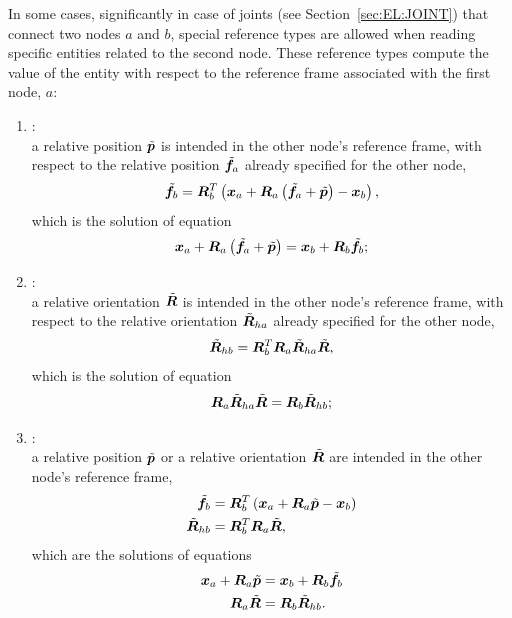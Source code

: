 In some cases, significantly in case of joints (see Section~\ref{sec:EL:JOINT}) that connect two nodes
$a$ and $b$, special reference types are allowed
when reading specific entities related to the second node.
These reference types compute the value of the entity with respect
to the reference frame associated with the first node, $a$:
\begin{enumerate}
\item {}: \\
	a relative position $\tilde{\boldsymbol{p}}$ is intended in the other node's
	reference frame, with respect to the relative position $\tilde{\boldsymbol{f}}_a$
	already specified for the other node,
\begin{equation}
	\tilde{\boldsymbol{f}}_b = \boldsymbol{R}_b^T\left( 
		\boldsymbol{x}_a + \boldsymbol{R}_a \left( 
			\tilde{\boldsymbol{f}}_a
			+ \tilde{\boldsymbol{p}}
		 \right)
		- \boldsymbol{x}_b
	 \right) ,
\end{equation}
	which is the solution of equation
\begin{equation}
	\boldsymbol{x}_a + \boldsymbol{R}_a \left( \tilde{\boldsymbol{f}}_a + \tilde{\boldsymbol{p}} \right)
	= \boldsymbol{x}_b + \boldsymbol{R}_b \tilde{\boldsymbol{f}}_b ;
\end{equation}

\item {}: \\
	a relative orientation $\tilde{\boldsymbol{R}} $ is intended in the other node's
	reference frame, with respect to the relative orientation
	$\tilde{\boldsymbol{R}}_{ha}$ already specified for the other node,
\begin{equation}
	\tilde{\boldsymbol{R}}_{hb} = \boldsymbol{R}_b^T \boldsymbol{R}_a \tilde{\boldsymbol{R}}_{ha} \tilde{\boldsymbol{R}} ,
\end{equation}
	which is the solution of equation
\begin{equation}
	\boldsymbol{R}_a \tilde{\boldsymbol{R}}_{ha} \tilde{\boldsymbol{R}}
	= \boldsymbol{R}_b \tilde{\boldsymbol{R}}_{hb} ;
\end{equation}

\item {}: \\
	a relative position $\tilde{\boldsymbol{p}}$
	or a relative orientation $\tilde{\boldsymbol{R}}$
	are intended in the other node's reference frame,
\begin{subequations}
\begin{align}
	\tilde{\boldsymbol{f}}_b &= \boldsymbol{R}_b^T\left( 
		\boldsymbol{x}_a + \boldsymbol{R}_a \tilde{\boldsymbol{p}}
		- \boldsymbol{x}_b
	 \right) \\
	\tilde{\boldsymbol{R}}_{hb} &= \boldsymbol{R}_b^T \boldsymbol{R}_a \tilde{\boldsymbol{R}} ,
\end{align}
\end{subequations}
	which are the solutions of equations
\begin{subequations}
\begin{align}
	\boldsymbol{x}_a + \boldsymbol{R}_a \tilde{\boldsymbol{p}}
	&= \boldsymbol{x}_b + \boldsymbol{R}_b \tilde{\boldsymbol{f}}_b \\
	\boldsymbol{R}_a \tilde{\boldsymbol{R}}
	&= \boldsymbol{R}_b \tilde{\boldsymbol{R}}_{hb} .
\end{align}
\end{subequations}
\end{enumerate}

